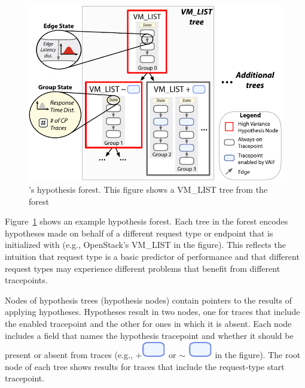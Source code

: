

{
\begin{figure}[tb]
  \centering
 
  \includegraphics[width=\columnwidth]{figures/hypo.pdf}
 
  \caption{\STAIF{}'s hypothesis forest. This figure shows a \textsc{VM\_LIST} tree from the forest}
  \label{fig:hyp_tree}
   
\end{figure}
}

Figure~\ref{fig:hyp_tree} shows an example hypothesis forest.  Each
tree in the forest encodes hypotheses made on behalf of a different
request type or endpoint that \STAIF{} is initialized with (e.g.,
OpenStack's \textsc{VM\_LIST} in the figure).  This reflects the
intuition that request type is a basic predictor of performance and
that different request types may experience different problems
that benefit from different tracepoints.



Nodes of hypothesis trees (hypothesis nodes) contain pointers to the
results of applying hypotheses. Hypotheses result in two
nodes, one for traces that include the enabled tracepoint and the other
for ones in which it is absent.  Each node includes a field that
names the hypothesis tracepoint and whether it should be present or
absent from traces (e.g., $+$\includegraphics[scale=0.7, trim=-0 0.1cm 0 0]{figures/blue_bubble.pdf} or $\sim$ \includegraphics[scale=0.7, trim=-0 0.1cm 0 0]{figures/blue_bubble.pdf} in the
figure).  The root node of each tree shows results for traces that
include the request-type start tracepoint.

